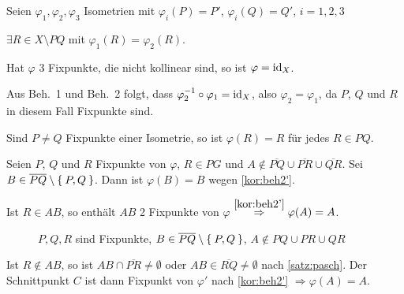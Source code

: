 \begin{beweis}
    Seien $\varphi_1, \varphi_2, \varphi_3$ Isometrien mit
    $\varphi_i(P) = P'$, $\varphi_i(Q) = Q'$, $i=1,2,3$

    \begin{behauptung}[1]
        $\exists R \in X \setminus PQ$ mit $\varphi_{1} (R) = \varphi_{2} (R)$.
    \end{behauptung}
    \begin{behauptung}[2]
        Hat $\varphi$ 3 Fixpunkte, die nicht kollinear sind,
        so ist $\varphi = \textnormal{id}_X$.
    \end{behauptung}

    Aus Beh.~1 und Beh.~2 folgt, dass $\varphi_2^{-1} \circ \varphi_1 = \textnormal{id}_X$,
    also $\varphi_2 = \varphi_1$, da $P$, $Q$ und $R$ in diesem Fall
    Fixpunkte sind.

    \begin{beweis}\leavevmode
        \begin{behauptung}
            Sind $P \neq Q$ Fixpunkte einer Isometrie, so ist 
            $\varphi(R) = R$ für jedes $R \in PQ$.
        \end{behauptung}
        \begin{beweis}
            Seien $P$, $Q$ und $R$ Fixpunkte von $\varphi$, $R \in PG$
            und $A \notin \overline{PQ} \cup \overline{PR} \cup \overline{QR}$.
            Sei $B \in \overline{PQ} \setminus \Set{P, Q}$. Dann ist
            $\varphi(B) = B$ wegen \cref{kor:beh2'}.

            Ist $R \in AB$, so enthält $AB$ 2 Fixpunkte von $\varphi$
            $\overset{\cref{kor:beh2'}}{\Rightarrow} \varphi(A) = A$.

            \begin{figure}[htp]
                \centering
                
                \caption{$P, Q, R$ sind Fixpunkte, $B \in \overline{PQ} \setminus \Set{P,Q}$, $A \notin PQ \cup PR \cup QR$}
                \label{fig:geometry-1}
            \end{figure}

            Ist $R \notin AB$, so ist $AB \cap \overline{PR} \neq \emptyset$
            oder $AB \in \overline{RQ} \neq \emptyset$ nach \cref{satz:pasch}.
            Der Schnittpunkt $C$ ist dann Fixpunkt von $\varphi'$
            nach \cref{kor:beh2'} $\Rightarrow \varphi(A) = A$.
        \end{beweis}


\end{beweis}
\end{beweis}
